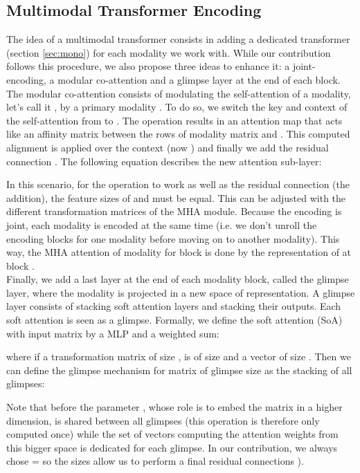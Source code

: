 \documentclass[11pt,a4paper]{article}
\begin{document}
\subsection{Multimodal Transformer Encoding}
\label{sec:multimo}
The idea of a multimodal transformer consists in adding a dedicated transformer (section \ref{sec:mono}) for each modality we work with. While our contribution follows this procedure, we also propose three ideas to enhance it: a joint-encoding, a modular co-attention \cite{yu2019deep} and a glimpse layer at the end of each block. \\

The modular co-attention consists of modulating the self-attention of a modality, let's call it , by a primary modality . To do so, we switch the key  and context  of the self-attention from  to . The operation  results in an attention map that acts like an affinity matrix between the rows of modality matrix  and  . This computed alignment is applied over the context  (now ) and finally we add the residual connection . The following equation describes the new attention sub-layer:



In this scenario, for the operation  to work as well as the residual connection (the addition), the feature sizes of  and  must be equal. This can be adjusted with the different transformation matrices of the MHA module. Because the encoding is joint, each modality is encoded at the same time (i.e. we don't unroll the encoding blocks for one modality before moving on to another modality). This way, the MHA attention of modality  for block  is done by the representation of  at block . \\

Finally, we add a last layer at the end of each modality block, called the glimpse layer, where the modality is projected in a new space of representation. A glimpse layer consists of stacking  soft attention layers and stacking their outputs. Each soft attention is seen as a glimpse. Formally, we define the soft attention (SoA)  with input matrix  by a MLP and a weighted sum:


where  if a transformation matrix of size ,  is of size  and  a vector of size . Then we can define the glimpse mechanism for matrix  of glimpse size  as the stacking of all glimpses:



Note that before the parameter , whose role is to embed the matrix  in a higher dimension, is shared between all glimpses (this operation is therefore only computed once) while the set of vectors  computing the attention weights from this bigger space is dedicated for each glimpse. In our contribution, we always chose  =  so the sizes allow us to perform a final residual connections ). \\
\end{document}
